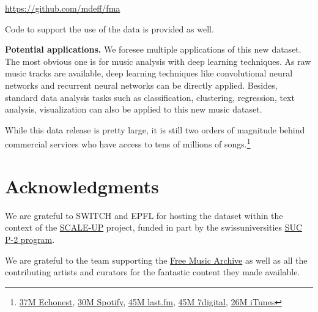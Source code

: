 \documentclass{article}
\begin{document}
\url{https://github.com/mdeff/fma}

Code to support the use of the data is provided as well.
 
{\bf Potential applications.}
We foresee multiple applications of this new dataset. The most obvious one is for music analysis with deep learning techniques. As raw music tracks are available, deep learning techniques like convolutional neural networks \cite{mnist} and recurrent neural networks \cite{art:HochreiterSchmidhuber97LSTM} can be directly applied. Besides, standard data analysis tasks such as classification, clustering, regression, text analysis, visualization can also be applied to this new music dataset.

While this data release is pretty large, it is still two orders of magnitude behind commercial services who have access to tens of millions of songs.\footnote{\href{http://the.echonest.com}{37M Echonest}, \href{https://en.wikipedia.org/wiki/Spotify}{30M Spotify}, \href{http://www.skilledtests.com/wiki/Last.fm_statistics}{45M last.fm}, \href{http://bupz.com/best-websites-to-buy-musics}{45M 7digital}, \href{https://www.apple.com/pr/library/2013/02/06iTunes-Store-Sets-New-Record-with-25-Billion-Songs-Sold.html}{26M iTunes}}


\section{Acknowledgments}

We are grateful to SWITCH and EPFL for hosting the dataset within the context
of the \href{https://projects.switch.ch/scale-up/}{SCALE-UP} project, funded in
part by the swissuniversities \href{http://www.swissuniversities.ch/isci}{SUC
P-2 program}.

We are grateful to the team supporting the \href{https://freemusicarchive.org}{Free Music Archive} as well as all the contributing artists and curators for the fantastic content they made available.



\end{document}
